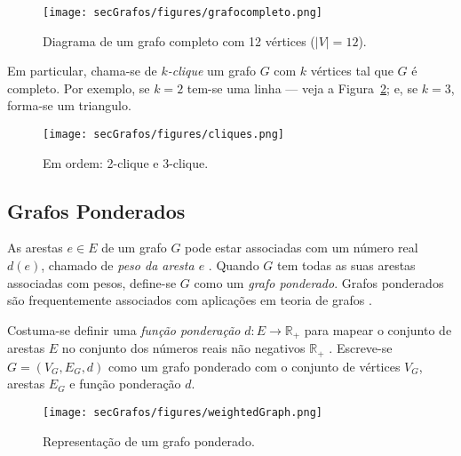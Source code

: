 \begin{figure}[H]
	\begin{center}
		\texttt{[image: secGrafos/figures/grafocompleto.png]}
	\end{center}
	\caption{Diagrama de um grafo completo com 12 vértices ($|V| = 12$).}
	\label{fig:grafocompleto}
\end{figure}

Em particular, chama-se de \textit{$k$-clique} um grafo $G$ com $k$ vértices tal que $G$ é completo. Por exemplo, se $k=2$ tem-se uma linha --- veja a Figura~\ref{fig:cliques}; e, se $k=3$, forma-se um triangulo.

\begin{figure}[H]
	\begin{center}
		\texttt{[image: secGrafos/figures/cliques.png]}
	\end{center}
	\caption{Em ordem: 2-clique e 3-clique.}
	\label{fig:cliques}
\end{figure}

\subsection{Grafos Ponderados}

As arestas $e\in E$ de um grafo $G$ pode estar associadas com um número real $d(e)$, chamado de \textit{peso da aresta $e$} \cite{graphTheoryApplicationsBondy}. Quando $G$ tem todas as suas arestas associadas com pesos, define-se $G$ como um \textit{grafo ponderado}. Grafos ponderados são frequentemente associados com aplicações em teoria de grafos \cite{grafosPremioElon}.

Costuma-se definir uma \textit{função ponderação} $d: E \longrightarrow \mathbb{R}_+$ para mapear o conjunto de arestas $E$ no conjunto dos números reais não negativos $\mathbb{R}_+$ \cite{libertiEDG}. Escreve-se $G = (V_G,E_G,d)$ como um grafo ponderado com o conjunto de vértices $V_G$, arestas $E_G$ e função ponderação $d$.

\begin{figure}[H]
	\begin{center}
		\texttt{[image: secGrafos/figures/weightedGraph.png]}
	\end{center}
	\caption{Representação de um grafo ponderado.}
	\label{fig:weightedGraph}
\end{figure}

